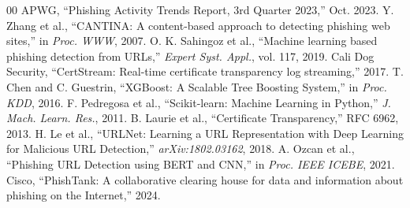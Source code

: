 \documentclass[conference]{IEEEtran}
\begin{document}
\begin{thebibliography}{00}
 APWG, ``Phishing Activity Trends Report, 3rd Quarter 2023,'' Oct. 2023.
 Y. Zhang et al., ``CANTINA: A content-based approach to detecting phishing web sites,'' in \textit{Proc. WWW}, 2007.
 O. K. Sahingoz et al., ``Machine learning based phishing detection from URLs,'' \textit{Expert Syst. Appl.}, vol. 117, 2019.
 Cali Dog Security, ``CertStream: Real-time certificate transparency log streaming,'' 2017.
 T. Chen and C. Guestrin, ``XGBoost: A Scalable Tree Boosting System,'' in \textit{Proc. KDD}, 2016.
 F. Pedregosa et al., ``Scikit-learn: Machine Learning in Python,'' \textit{J. Mach. Learn. Res.}, 2011.
 B. Laurie et al., ``Certificate Transparency,'' RFC 6962, 2013.
 H. Le et al., ``URLNet: Learning a URL Representation with Deep Learning for Malicious URL Detection,'' \textit{arXiv:1802.03162}, 2018.
 A. Ozcan et al., ``Phishing URL Detection using BERT and CNN,'' in \textit{Proc. IEEE ICEBE}, 2021.
 Cisco, ``PhishTank: A collaborative clearing house for data and information about phishing on the Internet,'' 2024.
\end{thebibliography}
\end{document}
